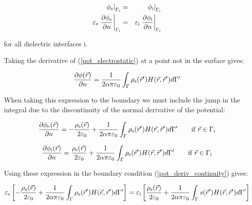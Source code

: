 \documentclass[12pt]{report}
\begin{document}
\begin{eqnarray}\left.\phi_{\rm{e}}\right|_{\Gamma_{\rm{i}}}&=&\left.\phi_{\rm{i}}\right|_{\Gamma_{\rm{i}}}\label{pot_continuity}\\\varepsilon_{\rm{e}}\left.\frac{\partial\phi_{\rm{e}}}{\partial n}\right|_{\Gamma_{\rm{i}}}&=&\varepsilon_{\rm{i}}\left.\frac{\partial\phi_{\rm{i}}}{\partial n}\right|_{\Gamma_{\rm{i}}}\label{pot_deriv_continuity}\end{eqnarray}

for all dielectric interfaces i.

Taking the derivative of (\ref{pot_electrostatic}) at a point not in the surface gives:

\begin{equation}\frac{\partial\phi(\vec{r})}{\partial n}=\frac{1}{2\alpha\pi\varepsilon_0}\int_\Gamma{\rho_{\rm s}(\vec{r}^\prime)H(\vec{r},\vec{r}^\prime)d\Gamma^\prime}\end{equation}

When taking this expression to the boundary we must include the jump in the integral due to the discontinuity of the normal derivative of the potential:

\begin{equation}\frac{\partial\phi_{\rm{e}}(\vec{r})}{\partial n}=-\frac{\rho_{\rm s}(\vec{r})}{2\varepsilon_0}+\frac{1}{2\alpha\pi\varepsilon_0}\int_\Gamma{\rho_{\rm s}(\vec{r}^\prime)H(\vec{r},\vec{r}^\prime)d\Gamma^\prime}\qquad\textrm{if $\vec{r}\in\Gamma_{\rm{i}}$}\end{equation}

\begin{equation}\frac{\partial\phi_{\rm{i}}(\vec{r})}{\partial n}=\frac{\rho_{\rm s}(\vec{r})}{2\varepsilon_0}+\frac{1}{2\alpha\pi\varepsilon_0}\int_\Gamma{\rho_{\rm s}(\vec{r}^\prime)H(\vec{r},\vec{r}^\prime)d\Gamma^\prime}\qquad\textrm{if $\vec{r}\in\Gamma_{\rm{i}}$}\end{equation}

Using these expression in the boundary condition (\ref{pot_deriv_continuity}) gives:

\begin{equation}\varepsilon_{\rm{e}}\left[-\frac{\rho_{\rm s}(\vec{r})}{2\varepsilon_0}+\frac{1}{2\alpha\pi\varepsilon_0}\int_\Gamma{\rho_{\rm s}(\vec{r}^\prime)H(\vec{r},\vec{r}^\prime)d\Gamma^\prime}\right]=\varepsilon_{\rm{i}}\left[\frac{\rho_{\rm s}(\vec{r})}{2\varepsilon_0}+\frac{1}{2\alpha\pi\varepsilon_0}\int_\Gamma{s(\vec{r}^\prime)H(\vec{r},\vec{r}^\prime)d\Gamma^\prime}\right]\end{equation}
\end{document}
